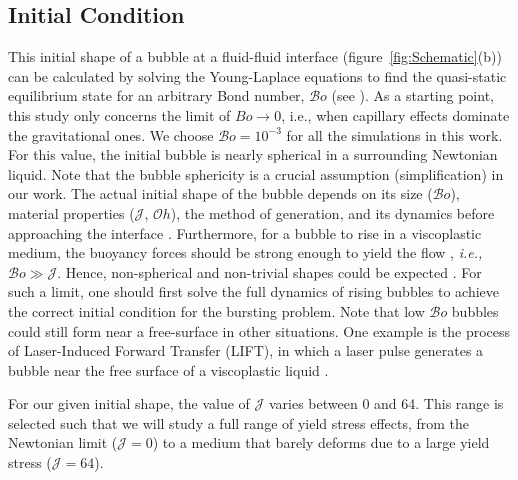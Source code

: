 \documentclass[final]{jfm}
\begin{document}
\subsection{Initial Condition}\label{Sec::Initial}
This initial shape of a bubble at a fluid-fluid interface (figure~\ref{fig:Schematic}(b)) can be calculated by solving the Young-Laplace equations to find the quasi-static equilibrium state for an arbitrary Bond number, $\mathcal{B}o$ (see \citet{lhuissier2012bursting, walls2015jet, deike2018dynamics,magnaudet2020particles}). As a starting point, this study only concerns the limit of $Bo \rightarrow 0$, i.e., when capillary effects dominate the gravitational ones. We choose $\mathcal{B}o = 10^{-3}$ for all the simulations in this work.  For this value, the initial bubble is nearly spherical in a surrounding Newtonian liquid.  Note that the bubble sphericity is a crucial assumption (simplification) in our work. The actual initial shape of the bubble depends on its size ($\mathcal{B}o$), material properties ($\mathcal{J}$, $\mathcal{O}h$), the method of generation, and its dynamics before approaching the interface \citep{dubash2004conditions, dimakopoulos2013steady}. Furthermore, for a bubble to rise in a viscoplastic medium, the buoyancy forces should be strong enough to yield the flow \citep{dubash2004conditions, sikorski2009motion, balmforth2014yielding}, \textit{i.e.,} $\mathcal{B}o \gg \mathcal{J}$. Hence, non-spherical and non-trivial shapes could be expected \citep{lopez2018rising}. For such a limit, one should first solve the full dynamics of rising bubbles to achieve the correct initial condition for the bursting problem. Note that low $\mathcal{B}o$ bubbles could still form near a free-surface in other situations. One example is the process of Laser-Induced Forward Transfer (LIFT), in which a laser pulse generates a bubble near the free surface of a viscoplastic liquid \citep{jalaal2019laser}.

For our given initial shape, the value of $\mathcal{J}$ varies between 0 and 64. This range is selected such that we will study a full range of yield stress effects, from the Newtonian limit ($\mathcal{J}=0$) to a medium that barely deforms due to a large yield stress ($\mathcal{J}=64$).
\end{document}
